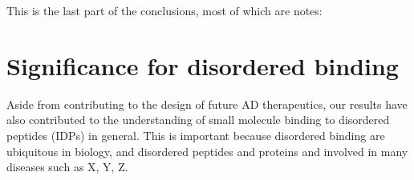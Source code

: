 








This is the last part of the conclusions, most of which are notes:

\section{Significance for disordered binding}
Aside from contributing to the design of future AD therapeutics, our results have also contributed to the understanding of small molecule binding to disordered peptides (IDPs) in general. This is important because disordered binding are ubiquitous in biology, and disordered peptides and proteins and involved in many diseases such as X, Y, Z.  

